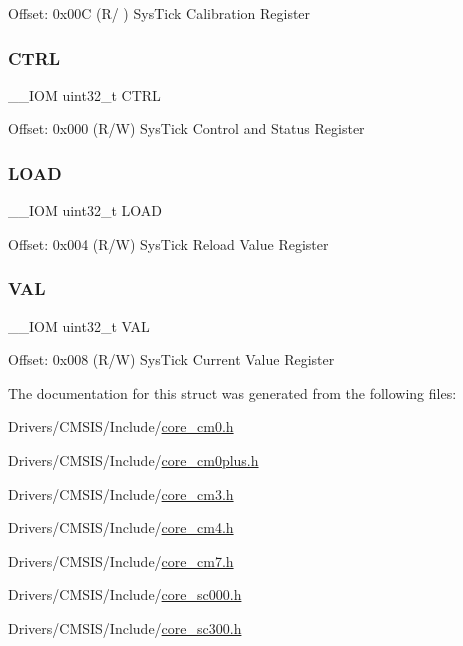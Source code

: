 Offset\+: 0x00C (R/ ) Sys\+Tick Calibration Register \mbox{\label{struct_sys_tick___type_ac81efc171e9852a36caeb47122bfec5b}} 
\subsubsection{\texorpdfstring{C\+T\+RL}{CTRL}}
{\footnotesize\ttfamily \+\_\+\+\_\+\+I\+OM uint32\+\_\+t C\+T\+RL}

Offset\+: 0x000 (R/W) Sys\+Tick Control and Status Register \mbox{\label{struct_sys_tick___type_a0c1333686137b7e25a46bd548a5b5bc3}} 
\subsubsection{\texorpdfstring{L\+O\+AD}{LOAD}}
{\footnotesize\ttfamily \+\_\+\+\_\+\+I\+OM uint32\+\_\+t L\+O\+AD}

Offset\+: 0x004 (R/W) Sys\+Tick Reload Value Register \mbox{\label{struct_sys_tick___type_ae7a655a853654127f3dfb7fa32c3f457}} 
\subsubsection{\texorpdfstring{V\+AL}{VAL}}
{\footnotesize\ttfamily \+\_\+\+\_\+\+I\+OM uint32\+\_\+t V\+AL}

Offset\+: 0x008 (R/W) Sys\+Tick Current Value Register 

The documentation for this struct was generated from the following files\+:\begin{DoxyCompactItemize}
\item 
Drivers/\+C\+M\+S\+I\+S/\+Include/\mbox{\hyperlink{core__cm0_8h}{core\+\_\+cm0.\+h}}\item 
Drivers/\+C\+M\+S\+I\+S/\+Include/\mbox{\hyperlink{core__cm0plus_8h}{core\+\_\+cm0plus.\+h}}\item 
Drivers/\+C\+M\+S\+I\+S/\+Include/\mbox{\hyperlink{core__cm3_8h}{core\+\_\+cm3.\+h}}\item 
Drivers/\+C\+M\+S\+I\+S/\+Include/\mbox{\hyperlink{core__cm4_8h}{core\+\_\+cm4.\+h}}\item 
Drivers/\+C\+M\+S\+I\+S/\+Include/\mbox{\hyperlink{core__cm7_8h}{core\+\_\+cm7.\+h}}\item 
Drivers/\+C\+M\+S\+I\+S/\+Include/\mbox{\hyperlink{core__sc000_8h}{core\+\_\+sc000.\+h}}\item 
Drivers/\+C\+M\+S\+I\+S/\+Include/\mbox{\hyperlink{core__sc300_8h}{core\+\_\+sc300.\+h}}\end{DoxyCompactItemize}
